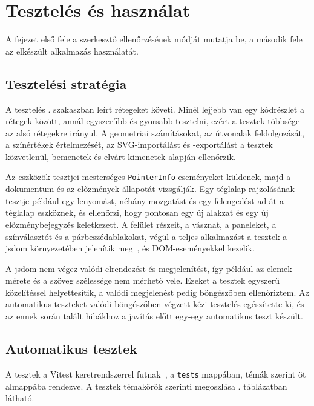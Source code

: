 \chapter{Tesztelés és használat}
\label{ch:test}

A fejezet első fele a szerkesztő ellenőrzésének módját mutatja be, a második fele az elkészült alkalmazás használatát.

\section{Tesztelési stratégia}
\label{sec:test_strategy}

A tesztelés . szakaszban leírt rétegeket követi. Minél lejjebb van egy kódrészlet a rétegek között, annál egyszerűbb és gyorsabb tesztelni, ezért a tesztek többsége az alsó rétegekre irányul. A geometriai számításokat, az útvonalak feldolgozását, a színértékek értelmezését, az SVG-importálást és -exportálást a tesztek közvetlenül, bemenetek és elvárt kimenetek alapján ellenőrzik.

Az eszközök tesztjei mesterséges \texttt{PointerInfo} eseményeket küldenek, majd a dokumentum és az előzmények állapotát vizsgálják. Egy téglalap rajzolásának tesztje például egy lenyomást, néhány mozgatást és egy felengedést ad át a téglalap eszköznek, és ellenőrzi, hogy pontosan egy új alakzat és egy új előzménybejegyzés keletkezett. A felület részeit, a vásznat, a paneleket, a színválasztót és a párbeszédablakokat, végül a teljes alkalmazást a tesztek a jsdom környezetében jelenítik meg~\cite{jsdom}, és DOM-eseményekkel kezelik.

A jsdom nem végez valódi elrendezést és megjelenítést, így például az elemek mérete és a szöveg szélessége nem mérhető vele. Ezeket a tesztek egyszerű közelítéssel helyettesítik, a valódi megjelenést pedig böngészőben ellenőriztem. Az automatikus teszteket valódi böngészőben végzett kézi tesztelés egészítette ki, és az ennek során talált hibákhoz a javítás előtt egy-egy automatikus teszt készült.

\section{Automatikus tesztek}
\label{sec:unit_tests}

A tesztek a Vitest keretrendszerrel futnak~\cite{vitest}, a \texttt{tests} mappában, témák szerint öt almappába rendezve. A tesztek témakörök szerinti megoszlása . táblázatban látható.

